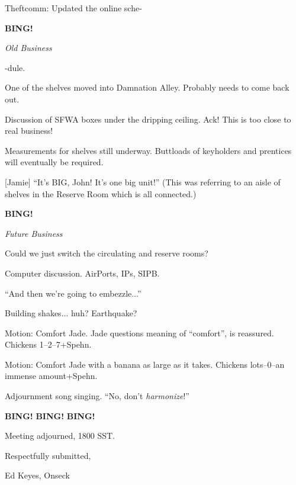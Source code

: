 \documentclass[12pt]{article}
\newcommand{\bing}{{\bf BING!} }
\newcommand{\goto}[1]{\bing \vskip 12pt \centerline{{\em{#1}}}}
\begin{document}
Theftcomm: Updated the online sche-

\goto{Old Business}

-dule.

One of the shelves moved into Damnation Alley.  Probably needs to come
back out.

Discussion of SFWA boxes under the dripping ceiling.  Ack!  This is too
close to real business!

Measurements for shelves still underway.  Buttloads of keyholders and
prentices will eventually be required.

[Jamie] ``It's BIG, John!  It's one big unit!''  (This was referring
to an aisle of shelves in the Reserve Room which is all connected.)

\goto{Future Business}

Could we just switch the circulating and reserve rooms?

Computer discussion.  AirPorts, IPs, SIPB.

``And then we're going to embezzle...''

Building shakes... huh?  Earthquake?

Motion: Comfort Jade.  Jade questions meaning of ``comfort'', is
reassured.  Chickens 1--2--7+Spehn.

Motion: Comfort Jade with a banana as large as it takes.  Chickens
lots--0--an immense amount+Spehn.

Adjournment song singing.  ``No, don't {\em harmonize}!''

\bing \bing \bing

\vspace{12pt}

\noindent
Meeting adjourned, 1800 SST.

\vspace{18pt}

\centerline{Respectfully submitted,}
\centerline{Ed Keyes, Onseck}
\end{document}
